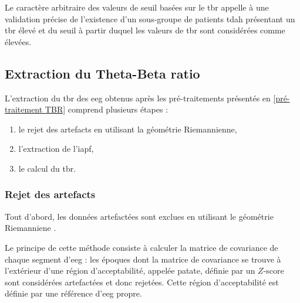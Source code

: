 Le caractère arbitraire des valeurs de seuil basées sur le \gls{tbr} appelle à une validation précise de l'existence d'un 
sous-groupe de patients \gls{tdah} présentant un \gls{tbr} élevé et du seuil à partir duquel les valeurs de \gls{tbr} sont considérées comme élevées.  
 
\subsection{Extraction du Theta-Beta ratio} \label{extraction_tbr}
L'extraction du \gls{tbr} des \gls{eeg} obtenus après les pré-traitements présentés en \ref{pré-traitement TBR} comprend plusieurs étapes :
\begin{enumerate}
\item le rejet des artefacts en utilisant la géométrie Riemannienne,
\item l'extraction de l'\gls{iapf},
\item le calcul du \gls{tbr}.
\end{enumerate}

\subsubsection{Rejet des artefacts}
Tout d'abord, les données artefactées sont exclues en utilisant le géométrie Riemanniene \citep{Barachant2013, Barthelemy2019}. 

Le principe de cette méthode consiste à calculer la matrice de covariance de chaque segment d'\gls{eeg} : les époques dont la matrice de covariance se trouve à l'extérieur d'une région
d'acceptabilité, appelée patate, définie par un $Z$-score sont considérées artefactées et donc rejetées. Cette région d'acceptabilité est définie par une référence d'\gls{eeg} propre.

